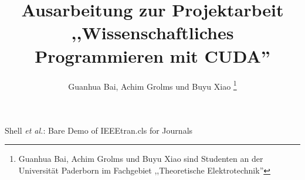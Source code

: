 \documentclass[journal]{IEEEtran}
\begin{document}
%
\title{Ausarbeitung zur Projektarbeit ,,Wissenschaftliches Programmieren mit CUDA''}
%
%
%

\author{Guanhua Bai,
        Achim Grolms und
        Buyu Xiao %
\thanks{Guanhua Bai, Achim Grolms und Buyu Xiao sind Studenten an der Universität Paderborn
im Fachgebiet ,,Theoretische Elektrotechnik''}%
}

%
%



%
{Shell \MakeLowercase{\textit{et al.}}: Bare Demo of IEEEtran.cls for Journals}
%
\end{document}
